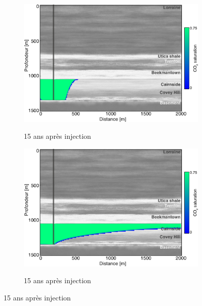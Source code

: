 \begin{figure}[!ht]
        \begin{subfigure}[b]{.47\textwidth}
                \caption{15 ans après injection }
                \includegraphics[width=\textwidth]{fig/15r.pdf}
                \label{fig:15r}
        \end{subfigure}
        \qquad
        \begin{subfigure}[b]{.47\textwidth}
                \caption{15 ans après injection  }
                \includegraphics[width=\textwidth]{fig/15o.pdf}
                \label{fig:15o}
        \end{subfigure}


\end{figure}
